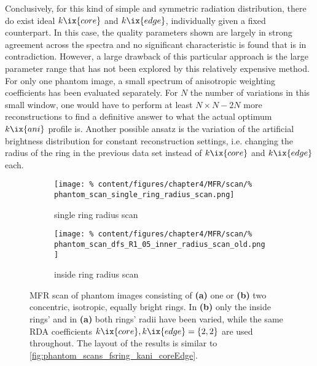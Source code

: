                 Conclusively, for this kind of simple and symmetric radiation distribution, there do exist ideal $k\ix{core}$ and $k\ix{edge}$, individually given a fixed counterpart. In this case, the quality parameters shown are largely in strong agreement across the spectra and no significant characteristic is found that is in contradiction. However, a large drawback of this particular approach is the large parameter range that has not been explored by this relatively expensive method. For only one phantom image, a small spectrum of anisotropic weighting coefficients has been evaluated separately. For $N$ the number of variations in this small window, one would have to perform at least $N\times N-2N$ more reconstructions to find a definitive answer to what the actual optimum $k\ix{ani}$ profile is. Another possible ansatz is the variation of the artificial brightness distribution for constant reconstruction settings, i.e. changing the radius of the ring in the previous data set instead of $k\ix{core}$ and $k\ix{edge}$ each.\\%
%
                \begin{figure}[t]%
                    \centering%
                    \begin{subfigure}{0.45\textwidth}%
                        \centering%
                        \texttt{[image: \%
                            content/figures/chapter4/MFR/scan/\%
                            phantom\_scan\_single\_ring\_radius\_scan.png]}%
                        \caption{single ring radius scan}%
                    \end{subfigure}%
                    \begin{subfigure}{0.45\textwidth}%
                        \centering%
                        \texttt{[image: \%
                            content/figures/chapter4/MFR/scan/\%
                            phantom\_scan\_dfs\_R1\_05\_inner\_radius\_scan\_old.png]}%
                        \caption{inside ring radius scan}%
                    \end{subfigure}%
                    \caption{MFR scan of phantom images consisting of \textbf{(a)} one or \textbf{(b)} two concentric, isotropic, equally bright rings. In \textbf{(b)} only the inside rings' and in \textbf{(a)} both rings' radii have been varied, while the same RDA coefficients $k\ix{core}, k\ix{edge}=\left\{2, 2\right\}$ are used throughout. The layout of the results is similar to \cref{fig:phantom_scans_fsring_kani_coreEdge}.}\label{fig:phantom_scans_fsring_doubleRings}%
                \end{figure}%
